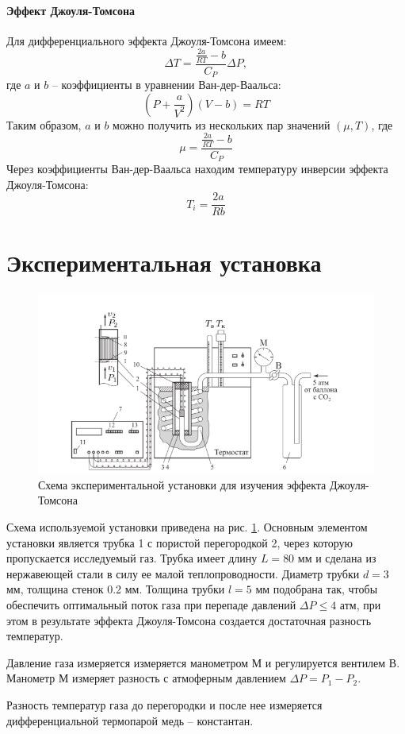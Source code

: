 \documentclass[12pt]{article}
\begin{document}
    \paragraph{Эффект Джоуля-Томсона} Для дифференциального эффекта Джоуля-Томсона
    имеем:
    \begin{equation}
        \Delta T = \frac{\frac{2a}{RT} - b}{C_P}\Delta P,
    \end{equation}
    где $a$ и $b$ -- коэффициенты в уравнении Ван-дер-Ваальса:
    \begin{equation}
        \left(P + \frac{a}{V^2}\right)(V - b) = RT
    \end{equation}
    Таким образом, $a$ и $b$ можно получить из нескольких пар значений 
    $(\mu, T)$, где 
    \begin{equation}
        \mu = \frac{\frac{2a}{RT} - b}{C_P}
        \label{mu}
    \end{equation}
    Через коэффициенты Ван-дер-Ваальса находим температуру инверсии эффекта
    Джоуля-Томсона:
    \begin{equation}
        T_i = \frac{2a}{Rb}
    \end{equation}

    \section{Экспериментальная установка}
    \begin{figure}[h]
        \centering
        \includegraphics[scale=3]{stand.png}
        \caption{Схема экспериментальной установки для изучения эффекта Джоуля-Томсона}
        \label{stand}
    \end{figure}
    Схема используемой установки приведена на рис. \ref{stand}. Основным
    элементом установки является трубка 1 с пористой перегородкой 2, через
    которую пропускается исследуемый газ. Трубка имеет длину $L = 80$ мм и
    сделана из нержавеющей стали в силу ее малой теплопроводности. Диаметр
    трубки $d = 3$ мм, толщина стенок 0.2 мм. Толщина трубки $l = 5$ мм 
    подобрана так, чтобы обеспечить оптимальный поток газа при перепаде
    давлений $\Delta P \le 4$ атм, при этом в результате эффекта Джоуля-Томсона
    создается достаточная разность температур. 
    \par Давление газа измеряется измеряется манометром М и регулируется 
    вентилем В. Манометр М измеряет разность с атмоферным давлением 
    $\Delta P = P_1 - P_2$.
    \par Разность температур газа до перегородки и после нее измеряется 
    дифференциальной термопарой медь -- константан.
\end{document}
